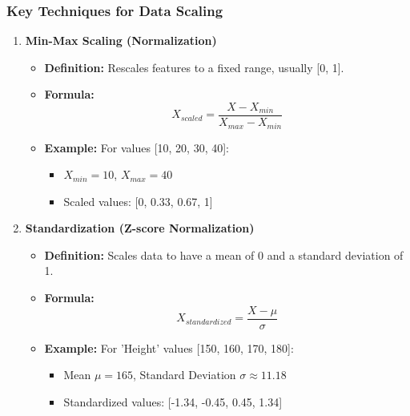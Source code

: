 \documentclass[aspectratio=169]{beamer}
\begin{document}
\begin{frame}[fragile]
  \frametitle{Key Techniques for Data Scaling}
  \begin{enumerate}
    \item \textbf{Min-Max Scaling (Normalization)}
      \begin{itemize}
        \item \textbf{Definition:} Rescales features to a fixed range, usually [0, 1].
        \item \textbf{Formula:}
          \begin{equation}
          X_{scaled} = \frac{X - X_{min}}{X_{max} - X_{min}}
          \end{equation}
        \item \textbf{Example:} For values [10, 20, 30, 40]:
          \begin{itemize}
            \item \(X_{min} = 10\), \(X_{max} = 40\)
            \item Scaled values: [0, 0.33, 0.67, 1]
          \end{itemize}
      \end{itemize}
      
    \item \textbf{Standardization (Z-score Normalization)}
      \begin{itemize}
        \item \textbf{Definition:} Scales data to have a mean of 0 and a standard deviation of 1.
        \item \textbf{Formula:}
          \begin{equation}
          X_{standardized} = \frac{X - \mu}{\sigma}
          \end{equation}
        \item \textbf{Example:} For 'Height' values [150, 160, 170, 180]:
          \begin{itemize}
            \item Mean \( \mu = 165 \), Standard Deviation \( \sigma \approx 11.18 \)
            \item Standardized values: [-1.34, -0.45, 0.45, 1.34]
          \end{itemize}
      \end{itemize}
  \end{enumerate}
\end{frame}
\end{document}
